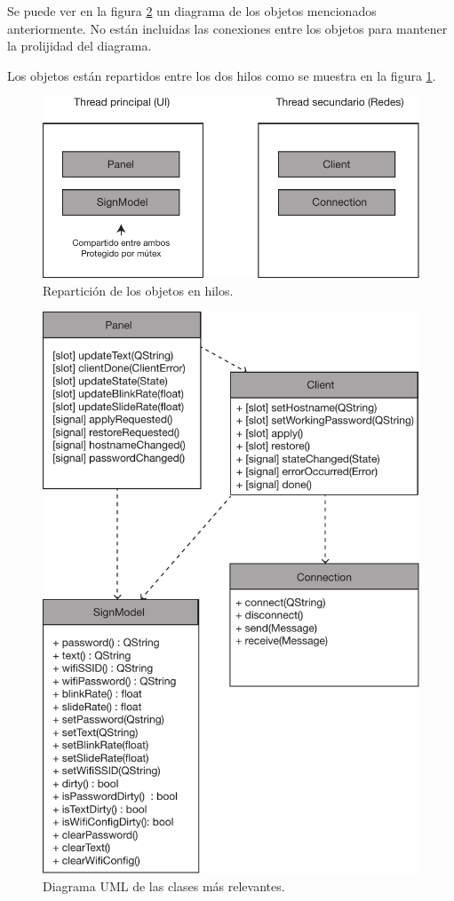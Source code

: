 Se puede ver en la figura \ref{fig:uml-cliente} un diagrama de los objetos mencionados anteriormente. No están incluidas las conexiones entre los objetos para mantener la prolijidad del diagrama.

Los objetos están repartidos entre los dos hilos como se muestra en la figura \ref{fig:qt-threads}.

\begin{figure}[!ht]
	\centering
	\includegraphics[scale=0.8]{imagenes/qt-threads.pdf}
	\caption{Repartición de los objetos en hilos.}
	\label{fig:qt-threads}
\end{figure}

\begin{figure}[!ht]
	\centering
	\includegraphics[scale=0.8]{imagenes/uml-cliente.pdf}
	\caption{Diagrama UML de las clases más relevantes.}
	\label{fig:uml-cliente}
\end{figure}

